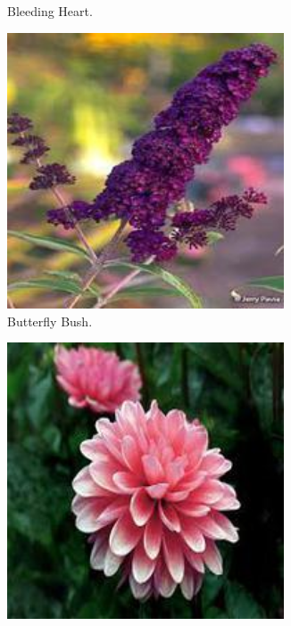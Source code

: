 \begin{figure}
\begin{subfigure}{0.24\textwidth}
        \caption{Bleeding Heart.}
    \end{subfigure}
    \begin{subfigure}{0.24\textwidth}
        \centering
        \includegraphics[width=0.9\textwidth]{../example_images/ButterflyBush.jpg}
        \caption{Butterfly Bush.}
    \end{subfigure}
    \begin{subfigure}{0.24\textwidth}
        \centering
        \includegraphics[width=0.9\textwidth]{../example_images/Dahlia.jpg}

\end{subfigure}
\end{figure}

